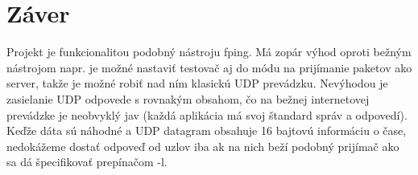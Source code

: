 \documentclass[11pt,a4paper]{report}
\begin{document}
\chapter{Záver}
Projekt je funkcionalitou podobný nástroju fping. Má zopár výhod oproti bežným nástrojom napr. je možné nastaviť testovač aj do módu na prijímanie paketov ako server, takže je možné robiť nad ním klasickú UDP prevádzku. Nevýhodou je zasielanie UDP odpovede s rovnakým obsahom, čo na bežnej internetovej prevádzke je neobvyklý jav (každá aplikácia má svoj štandard správ a odpovedí). Keďže dáta sú náhodné a UDP datagram obsahuje 16 bajtovú informáciu o čase, nedokážeme dostať odpoveď od uzlov iba ak na nich beží podobný prijímač ako sa dá špecifikovať prepínačom -l.
\end{document}
